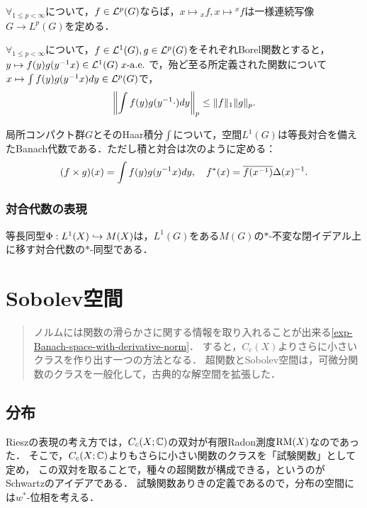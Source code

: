 \documentclass[uplatex,dvipdfmx]{jsreport}
\begin{document}
\begin{proposition}
    $\forall_{1\le p<\infty}$について，$f\in\mathcal{L}^p(G)$ならば，$x\mapsto{}_xf,x\mapsto{}^xf$は一様連続写像$G\to L^p(G)$を定める．
\end{proposition}

\begin{proposition}
    $\forall_{1\le p<\infty}$について，$f\in\mathcal{L}^1(G),g\in\mathcal{L}^p(G)$をそれぞれBorel関数とすると，$y\mapsto f(y)g(y^{-1}x)\in\mathcal{L}^1(G)\;x\text{-}\mathrm{a.e.}\;$で，殆ど至る所定義された関数について$x\mapsto\int f(y)g(y^{-1}x)dy\in\mathcal{L}^p(G)$で，
    \[\left\|\int f(y)g(y^{-1}\cdot)dy\right\|_p\le\|f\|_1\|g\|_p.\]
\end{proposition}

\begin{theorem}
    局所コンパクト群$G$とそのHaar積分$\int$について，空間$L^1(G)$は等長対合を備えたBanach代数である．ただし積と対合は次のように定める：
    \[(f\times g)(x)=\int f(y)g(y^{-1}x)dy,\quad f^*(x)=\overline{f(x^{-1})}\Delta(x)^{-1}.\]
\end{theorem}

\subsection{対合代数の表現}

\begin{proposition}
    等長同型$\Phi:L^1(X)\hookrightarrow M(X)$は，$L^1(G)$をある$M(G)$の$*$-不変な閉イデアル上に移す対合代数の$*$-同型である．
\end{proposition}

\chapter{Sobolev空間}

\begin{quotation}
    ノルムには関数の滑らかさに関する情報を取り入れることが出来る\ref{exp-Banach-space-with-derivative-norm}．
    すると，$C_c(X)$よりさらに小さいクラスを作り出す一つの方法となる．
    超関数とSobolev空間は，可微分関数のクラスを一般化して，古典的な解空間を拡張した．
\end{quotation}

\section{分布}

\begin{tcolorbox}[colframe=ForestGreen, colback=ForestGreen!10!white,breakable,colbacktitle=ForestGreen!40!white,coltitle=black,fonttitle=\bfseries\sffamily,
title=]
    Rieszの表現の考え方では，$C_c(X;\mathbb{C})$の双対が有限Radon測度$\mathrm{RM}(X)$なのであった．
    そこで，$C_c(X;\mathbb{C})$よりもさらに小さい関数のクラスを「試験関数」として定め，
    この双対を取ることで，種々の超関数が構成できる，というのがSchwartzのアイデアである．
    試験関数ありきの定義であるので，分布の空間には$w^*$-位相を考える．
\end{tcolorbox}
\end{document}
